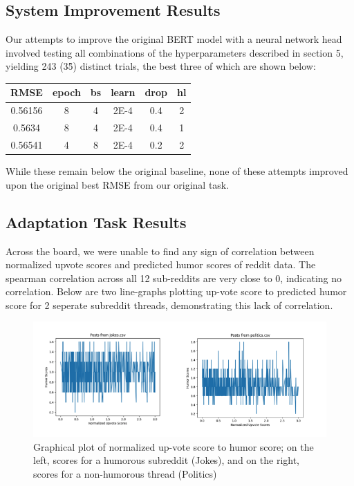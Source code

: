 \documentclass{article}
\begin{document}
\subsection{System Improvement Results}

Our attempts to improve the original BERT model with a neural network head involved testing all combinations of the hyperparameters described in section 5, yielding 243 (3\^5) distinct trials, the best three of which are shown below:

\begin{center}
\begin{tabular}{|c|c|c|c|c|c|}
\hline
RMSE & epoch & bs & learn & drop & hl \\
\hline
0.56156 & 8 & 4 & 2E-4 & 0.4 & 2 \\
0.5634 & 8 & 4 & 2E-4 & 0.4 & 1 \\
0.56541 & 4 & 8 & 2E-4 & 0.2 & 2 \\
\hline
\end{tabular}
\end{center}

While these remain below the original baseline, none of these attempts improved upon the original best RMSE from our original task.

\subsection{Adaptation Task Results}

Across the board, we were unable to find any sign of correlation between normalized upvote scores and predicted humor scores of reddit data.  The spearman correlation across all 12 sub-reddits are very close to 0, indicating no correlation. Below are two line-graphs plotting up-vote score to predicted humor score for 2 seperate subreddit threads, demonstrating this lack of correlation.



\begin{figure}[h]
\centering
\includegraphics[width=.5 \textwidth]{correlation_comparison.png}
\caption{Graphical plot of normalized up-vote score to humor score; on the left, scores for a humorous subreddit (Jokes), and on the right, scores for a non-humorous thread (Politics)}
\end{figure}
\end{document}
